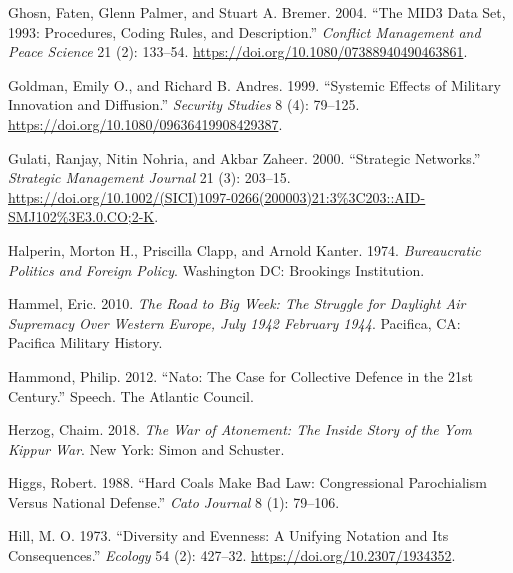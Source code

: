 \documentclass[
  12,
  letterpaper,
  DIV=11,
  numbers=noendperiod]{scrartcl}
\newlength{\cslhangindent}
\newlength{\cslentryspacingunit} %
\newenvironment{CSLReferences}[2] %
 {%
  \setlength{\parindent}{0pt}
  \ifodd #1
  \let\oldpar\par
  \def\par{\hangindent=\cslhangindent\oldpar}
  \fi
  \setlength{\parskip}{#2\cslentryspacingunit}
 }%
 {}
\begin{document}
\begin{CSLReferences}{1}{0}
\leavevmode{}%
Ghosn, Faten, Glenn Palmer, and Stuart A. Bremer. 2004. {``The {MID3
Data Set}, 1993: {Procedures}, {Coding Rules}, and
{Description}.''} \emph{Conflict Management and Peace Science} 21 (2):
133--54. \url{https://doi.org/10.1080/07388940490463861}.

\leavevmode{}%
Goldman, Emily O., and Richard B. Andres. 1999. {``Systemic Effects of
Military Innovation and Diffusion.''} \emph{Security Studies} 8 (4):
79--125. \url{https://doi.org/10.1080/09636419908429387}.

\leavevmode{}%
Gulati, Ranjay, Nitin Nohria, and Akbar Zaheer. 2000. {``Strategic
Networks.''} \emph{Strategic Management Journal} 21 (3): 203--15.
\url{https://doi.org/10.1002/(SICI)1097-0266(200003)21:3\%3C203::AID-SMJ102\%3E3.0.CO;2-K}.

\leavevmode{}%
Halperin, Morton H., Priscilla Clapp, and Arnold Kanter. 1974.
\emph{Bureaucratic {Politics} and {Foreign Policy}}. {Washington DC}:
{Brookings Institution}.

\leavevmode{}%
Hammel, Eric. 2010. \emph{The {Road} to {Big Week}: {The Struggle} for
{Daylight Air Supremacy Over Western Europe}, {July} 1942 \textendash{}
{February} 1944}. {Pacifica, CA}: {Pacifica Military History}.

\leavevmode{}%
Hammond, Philip. 2012. {``Nato: The Case for Collective Defence in the
21st {Century}.''} Speech. {The Atlantic Council}.

\leavevmode{}%
Herzog, Chaim. 2018. \emph{The {War} of {Atonement}: {The Inside Story}
of the {Yom Kippur War}}. {New York}: {Simon and Schuster}.

\leavevmode{}%
Higgs, Robert. 1988. {``Hard {Coals Make Bad Law}: {Congressional
Parochialism} Versus {National Defense}.''} \emph{Cato Journal} 8 (1):
79--106.

\leavevmode{}%
Hill, M. O. 1973. {``Diversity and {Evenness}: {A Unifying Notation} and
{Its Consequences}.''} \emph{Ecology} 54 (2): 427--32.
\url{https://doi.org/10.2307/1934352}.


\end{CSLReferences}
\end{document}

